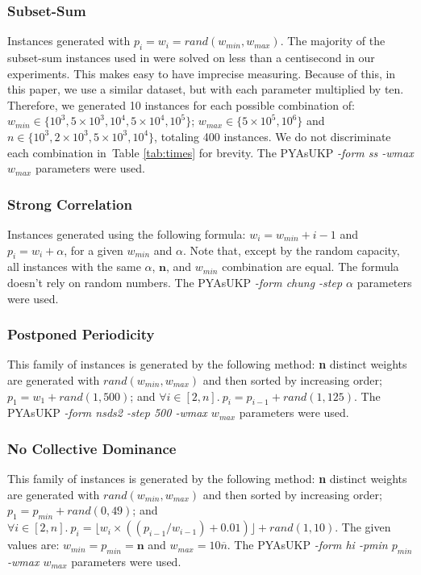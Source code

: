 \documentclass[runningheads,a4paper]{llncs}
\begin{document}
\subsubsection{Subset-Sum}\label{sec:subsetsum}
Instances generated with \(p_i = w_i = rand(w_{min}, w_{max})\). 
The majority of the subset-sum instances used in \cite{pya} were solved on less than a centisecond in our experiments. 
This makes easy to have imprecise measuring. 
Because of this, in this paper, we use a similar dataset, but with each parameter multiplied by ten. 
Therefore, we generated 10 instances for each possible combination of: \(w_{min} \in \{10^3, 5\times10^3, 10^4, 5\times10^4, 10^5\}\); \(w_{max} \in \{5\times10^5, 10^6\}\) and \(n \in \{10^3, 2\times10^3, 5\times10^3, 10^4\}\), totaling 400 instances. We do not discriminate each combination in~Table \ref{tab:times} for brevity. The PYAsUKP \emph{-form ss -wmax \(w_{max}\)} parameters were used.

\subsubsection{Strong Correlation}
Instances generated using the following formula: \(w_i = w_{min} + i - 1\) and \(p_i = w_i + \alpha\), for a given \(w_{min}\) and \(\alpha\).  Note that, except by the random capacity, all instances with the same \(\alpha\), \(\mathbf{n}\), and \(w_{min}\) combination are equal. The formula doesn't rely on random numbers. The PYAsUKP \emph{-form chung -step \(\alpha\) } parameters were used.

\subsubsection{Postponed Periodicity}
This family of instances is generated by the following method: \textbf{n} distinct weights are generated with \(rand(w_{min}, w_{max})\) and then sorted by increasing order; \(p_1 = w_1 + rand(1, 500)\); and \(\forall i \in [2, n].~p_i = p_{i-1} + rand(1, 125)\). The PYAsUKP \emph{-form nsds2 -step 500 -wmax \(w_{max}\)} parameters were used.

\subsubsection{No Collective Dominance}
This family of instances is generated by the following method: \textbf{n} distinct weights are generated with \(rand(w_{min}, w_{max})\) and then sorted by increasing order; \(p_1 = p_{min} + rand(0, 49)\); and \(\forall i \in [2, n].~p_i = \lfloor w_i \times ((p_{i-1}/w_{i-1}) + 0.01)\rfloor + rand(1, 10)\). The given values are: \(w_{min} = p_{min} = \mathbf{n}\) and \(w_{max} = 10\overline{n}\). The PYAsUKP \emph{-form hi -pmin \(p_{min}\) -wmax \(w_{max}\)} parameters were used.
\end{document}
